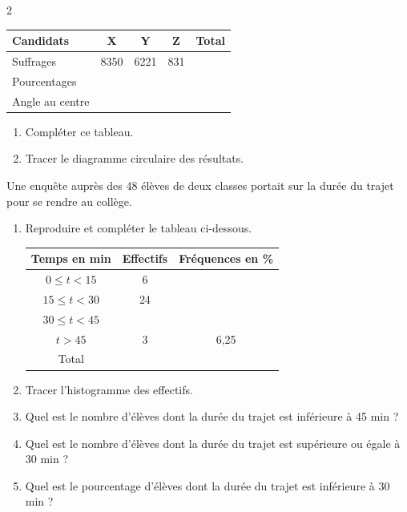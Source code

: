 \begin{multicols*}{2}
 \begin{center}
 	\begin{tabular}{|l|c|c|c|c|}
 		\hline
 		Candidats & X & Y & Z & Total \\
 		\hline
 		Suffrages & 8350 & 6221 & 831 & \\
 		\hline
 		Pourcentages & & & & \\
 		\hline
 		Angle au centre & & & & \\
 		\hline
 	\end{tabular}
 \end{center}
 
 \begin{enumerate}
 	\item Compléter ce tableau.
 	\item Tracer le diagramme circulaire des résultats.
 \end{enumerate}
 
 Une enquête auprès des 48 élèves de deux classes portait sur la durée du trajet pour se rendre au collège.
 \begin{enumerate}
 	\item Reproduire et compléter le tableau ci-dessous.
 	
 	\begin{center}
 		\begin{tabular}{|c|c|c|}
 			\hline
 			Temps en min & Effectifs & Fréquences en \% \\
 			\hline
 			$0 \leq t < 15$ & 6 & \\
 			\hline
 			$15 \leq t < 30$ & 24 & \\
 			\hline
 			$30 \leq t < 45$ & & \\
 			\hline
 			$t > 45$ & 3 & 6{,}25 \\
 			\hline
 			Total & & \\
 			\hline
 		\end{tabular}
 	\end{center}
 	
 	\item Tracer l'histogramme des effectifs.
 	\item Quel est le nombre d'élèves dont la durée du trajet est inférieure à 45 min ?
 	\item Quel est le nombre d'élèves dont la durée du trajet est supérieure ou égale à 30 min ?
 	\item Quel est le pourcentage d'élèves dont la durée du trajet est inférieure à 30 min ?
 \end{enumerate}
 


\end{multicols*}
